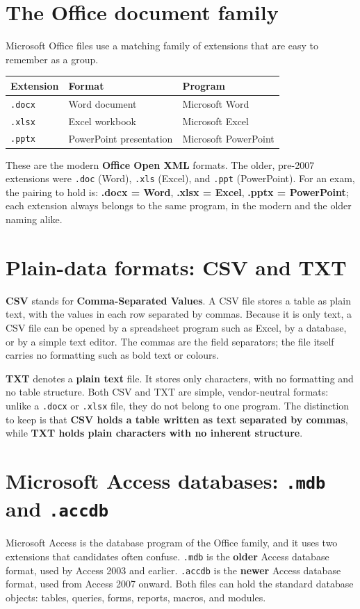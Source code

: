 \documentclass[11pt]{article}
\begin{document}
\section{The Office document family}
Microsoft Office files use a matching family of extensions that are easy to
remember as a group.

\begin{center}
\begin{tabular}{p{}p{}p{}}
\toprule
\textbf{Extension} & \textbf{Format} & \textbf{Program} \\
\midrule
\texttt{.docx} & Word document & Microsoft Word \\
\texttt{.xlsx} & Excel workbook & Microsoft Excel \\
\texttt{.pptx} & PowerPoint presentation & Microsoft PowerPoint \\
\bottomrule
\end{tabular}
\end{center}

These are the modern \textbf{Office Open XML} formats. The older, pre-2007
extensions were \texttt{.doc} (Word), \texttt{.xls} (Excel), and \texttt{.ppt}
(PowerPoint). For an exam, the pairing to hold is: \textbf{.docx = Word},
\textbf{.xlsx = Excel}, \textbf{.pptx = PowerPoint}; each extension always
belongs to the same program, in the modern and the older naming alike.

\section{Plain-data formats: CSV and TXT}
\textbf{CSV} stands for \textbf{Comma-Separated Values}. A CSV file stores a
table as plain text, with the values in each row separated by commas. Because
it is only text, a CSV file can be opened by a spreadsheet program such as
Excel, by a database, or by a simple text editor. The commas are the field
separators; the file itself carries no formatting such as bold text or
colours.

\textbf{TXT} denotes a \textbf{plain text} file. It stores only characters,
with no formatting and no table structure. Both CSV and TXT are simple,
vendor-neutral formats: unlike a \texttt{.docx} or \texttt{.xlsx} file, they
do not belong to one program. The distinction to keep is that \textbf{CSV
holds a table written as text separated by commas}, while \textbf{TXT holds
plain characters with no inherent structure}.

\section{Microsoft Access databases: \texttt{.mdb} and \texttt{.accdb}}
Microsoft Access is the database program of the Office family, and it uses
two extensions that candidates often confuse. \texttt{.mdb} is the
\textbf{older} Access database format, used by Access 2003 and earlier.
\texttt{.accdb} is the \textbf{newer} Access database format, used from
Access 2007 onward. Both files can hold the standard database objects:
tables, queries, forms, reports, macros, and modules.
\end{document}

